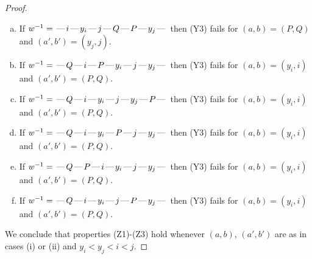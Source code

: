 \documentclass[10pt]{article}
\theoremstyle{definition}
\theoremstyle{definition}
\def\dash{\text{\hspace{0.5mm}---\hspace{0.5mm}}}
\begin{document}
\begin{proof}
\begin{enumerate}
\begin{enumerate}[(a)]
\item If $w^{-1} = \dash i\dash y_i\dash j\dash Q\dash P\dash y_j\dash $ then (Y3) fails for $(a,b)=(P,Q)$ and $(a',b')=(y_j,j)$.
\item If $w^{-1} = \dash Q\dash i\dash P\dash y_i\dash j\dash y_j\dash $ then (Y3) fails for $(a,b)=(y_i,i)$ and $(a',b')=(P,Q)$.
\item If $w^{-1} = \dash Q\dash i\dash y_i\dash j\dash y_j\dash P\dash $ then (Y3) fails for $(a,b)=(y_i,i)$ and $(a',b')=(P,Q)$.
\item If $w^{-1} = \dash Q\dash i\dash y_i\dash P\dash j\dash y_j\dash $ then (Y3) fails for $(a,b)=(y_i,i)$ and $(a',b')=(P,Q)$.
\item If $w^{-1} = \dash Q\dash P\dash i\dash y_i\dash j\dash y_j\dash $ then (Y3) fails for $(a,b)=(y_i,i)$ and $(a',b')=(P,Q)$.
\item If $w^{-1} = \dash Q\dash i\dash y_i\dash j\dash P\dash y_j\dash $ then (Y3) fails for $(a,b)=(y_i,i)$ and $(a',b')=(P,Q)$.
\end{enumerate}
\end{enumerate}
We conclude that properties (Z1)-(Z3) hold whenever $(a,b)$, $(a',b')$ are as in cases (i) or (ii) and $y_i < y_j < i < j$.

\end{proof}
\end{document}
